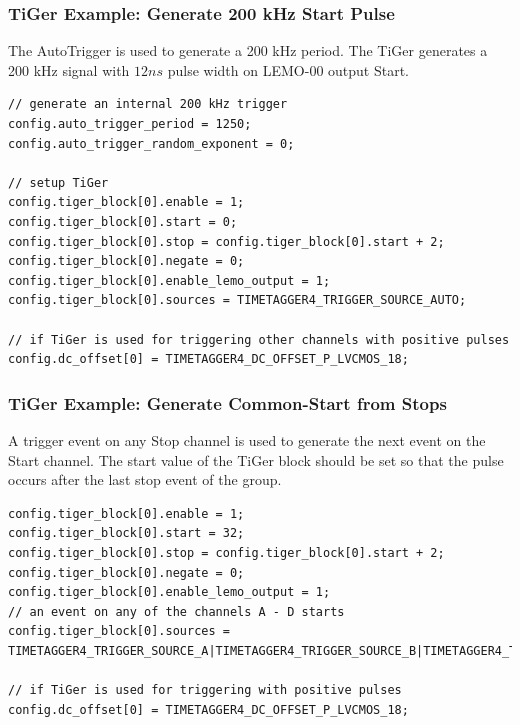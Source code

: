 		
		\subsubsection{TiGer Example: Generate 200 kHz Start Pulse}
		The AutoTrigger is used to generate a 200 kHz period. The TiGer generates a 200 kHz signal with $12 ns$ pulse width on LEMO-00 output Start.
\begin{lstlisting}[frame=tlrb]
// generate an internal 200 kHz trigger
config.auto_trigger_period = 1250;
config.auto_trigger_random_exponent = 0;

// setup TiGer
config.tiger_block[0].enable = 1;
config.tiger_block[0].start = 0;
config.tiger_block[0].stop = config.tiger_block[0].start + 2;
config.tiger_block[0].negate = 0;
config.tiger_block[0].enable_lemo_output = 1;
config.tiger_block[0].sources = TIMETAGGER4_TRIGGER_SOURCE_AUTO;

// if TiGer is used for triggering other channels with positive pulses
config.dc_offset[0] = TIMETAGGER4_DC_OFFSET_P_LVCMOS_18; 
\end{lstlisting}

	\subsubsection{TiGer Example: Generate Common-Start from Stops}
	A trigger event on any Stop channel is used to generate the next event on the Start channel. 
	The start value of the TiGer block should be set so that the pulse occurs after the last stop event of the group.
\begin{lstlisting}[frame=tlrb]
config.tiger_block[0].enable = 1;
config.tiger_block[0].start = 32;
config.tiger_block[0].stop = config.tiger_block[0].start + 2;
config.tiger_block[0].negate = 0;
config.tiger_block[0].enable_lemo_output = 1;
// an event on any of the channels A - D starts 
config.tiger_block[0].sources = TIMETAGGER4_TRIGGER_SOURCE_A|TIMETAGGER4_TRIGGER_SOURCE_B|TIMETAGGER4_TRIGGER_SOURCE_C|TIMETAGGER4_TRIGGER_SOURCE_D;

// if TiGer is used for triggering with positive pulses
config.dc_offset[0] = TIMETAGGER4_DC_OFFSET_P_LVCMOS_18; 
\end{lstlisting}
	
